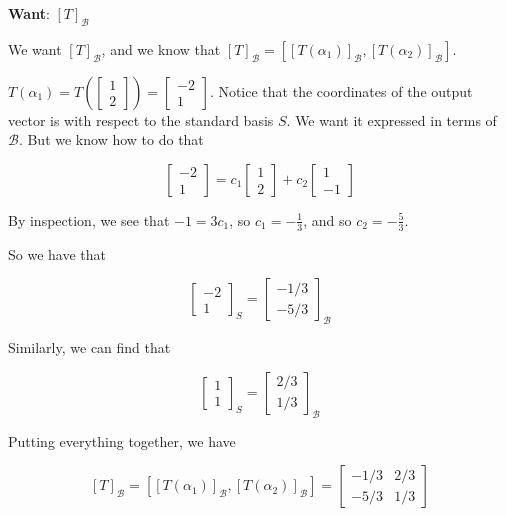 \documentclass[12pt]{article}
\def\B{\mathcal B}
\begin{document}
  {\bf Want}: $[T]_\B$

  We want $[T]_\B$, and we know that $[T]_\B = \left[[T(\alpha_1)]_\B,
  [T(\alpha_2)]_\B\right]$.

  $T(\alpha_1) = T(\begin{bmatrix} 1 \\ 2 \end{bmatrix}) = \begin{bmatrix} -2 \\
  1 \end{bmatrix}$. Notice that the coordinates of the output vector is with
  respect to the standard basis $S$. We want it expressed in terms of $\B$. But
  we know how to do that

  \[
    \begin{bmatrix}
      -2 \\
      1
    \end{bmatrix}
    =
    c_1
    \begin{bmatrix}
      1 \\ 2
    \end{bmatrix}
    + c_2
    \begin{bmatrix}
      1 \\ -1
    \end{bmatrix}
  \]

  By inspection, we see that $-1 = 3c_1$, so $c_1 = -\frac{1}{3}$, and so $c_2 =
  -\frac{5}{3}$.

  So we have that

  \[
    \begin{bmatrix}
      -2 \\ 1
    \end{bmatrix}_S
    =
    \begin{bmatrix}
      -1 / 3 \\ -5 / 3
    \end{bmatrix}_\B
  \]

  Similarly, we can find that

  \[
    \begin{bmatrix}
      1 \\ 1
    \end{bmatrix}_S
    =
    \begin{bmatrix}
      2 / 3 \\ 1 / 3
    \end{bmatrix}_\B
  \]

  Putting everything together, we have

  \[
    [T]_\B = \left[[T(\alpha_1)]_\B, [T(\alpha_2)]_\B\right]
    = \begin{bmatrix}
      -1 / 3 & 2 / 3 \\
      -5 / 3 & 1 / 3
    \end{bmatrix}
  \]
\end{document}
